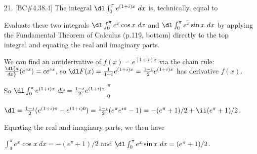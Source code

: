 






\loadmsbm


\dl{\displaystyle}
\ctln{\centerline}
\ssk{\smallskip}
\msk{\medskip}
\bsk{\bigskip}
\ubr{\underbar}


\overfullrule=0pt
\nopagenumbers






\bsk


\bsk


\item{21.} [BC\#4.38.4] The integral $\dl \int_0^\pi e^{(1+i)x}\ dx$ is, technically, equal to


\msk




\msk


\item{} Evaluate these two integrals 
$\dl \int_0^\pi e^{x}\cos x\ dx$ and $\dl\int_0^\pi e^{x}\sin x\ dx$ by 
applying the Fundamental Theorem of Calculus (p.119, bottom) directly to the top
integral and equating the real and imaginary parts.

\msk

\item{} We can find an antiderivative of $f(x)=e^{(1+i)x}$ via the chain rule:
$\dl{{d}\over{dx}}(e^{cx})=ce^{cx}$, so $\dl F(x)={{1}\over{1+i}}e^{(1+i)x}
={{1-i}\over{2}}e^{(1+i)x}$ has derivative $f(x)$.

\ssk

\item{} So $\dl \int_0^\pi e^{(1+i)x}\ dx = {{1-i}\over{2}}e^{(1+i)x}\Big|_0^\pi$

\hfill $\dl = 
{{1-i}\over{2}}(e^{(1+i)\pi}-e^{(1+i)0}) = 
{{1-i}\over{2}}(e^{\pi}e^{i\pi}-1) = -(e^{\pi}+1)/2+\ii(e^{\pi}+1)/2$.

\ssk

\item{} Equating the real and imaginary parts, we then have

\ssk

\item{} $\int_0^\pi e^{x}\cos x\ dx = -(e^{\pi}+1)/2$ and 
$\dl \int_0^\pi e^{x}\sin x\ dx = (e^{\pi}+1)/2$.


